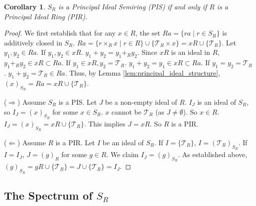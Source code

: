 \documentclass[11pt, a4paper]{article}
\theoremstyle{plain}
\newtheorem{corollary}[theorem]{Corollary}
\theoremstyle{definition}
\numberwithin{equation}{section}
\newcommand{\Tobj}{\mathcal{T}} %
\newcommand{\SR}{S_{R}}
\begin{document}
\begin{corollary}\label{cor:SR_is_PIS}
$\SR$ is a Principal Ideal Semiring (PIS) if and only if $R$ is a Principal Ideal Ring (PIR).
\end{corollary}
\begin{proof}
We first establish that for any $x \in R$, the set $Ra = \{ra \mid r \in \SR\}$ is additively closed in $\SR$.
$Ra = \{r\times_{R} x \mid r \in R\} \cup \{\Tobj_R\times x\} = xR \cup \{\Tobj_R\}$.
Let $y_1, y_2 \in Ra$.
If $y_1, y_2 \in xR$. $y_1+y_2 = y_1+_R y_2$. Since $xR$ is an ideal in $R$, $y_1+_R y_2 \in xR \subset Ra$.
If $y_1 \in xR, y_2=\Tobj_R$. $y_1+y_2=y_1 \in xR \subset Ra$.
If $y_1=y_2=\Tobj_R$. $y_1+y_2=\Tobj_R \in Ra$.
Thus, by Lemma \ref{lem:principal_ideal_structure}, $(x)_{\SR} = Ra = xR \cup \{\Tobj_R\}$.

($\Rightarrow$) Assume $\SR$ is a PIS. Let $J$ be a non-empty ideal of $R$. $I_J$ is an ideal of $\SR$, so $I_J=(x)_{\SR}$ for some $x \in \SR$. $x$ cannot be $\Tobj_R$ (as $J\neq\emptyset$). So $x \in R$.
$I_J = (x)_{\SR} = xR \cup \{\Tobj_R\}$.
This implies $J=xR$. So $R$ is a PIR.

($\Leftarrow$) Assume $R$ is a PIR. Let $I$ be an ideal of $\SR$.
If $I=\{\Tobj_R\}$, $I=(\Tobj_R)_{\SR}$.
If $I=I_J$, $J=(g)_{R}$ for some $g \in R$. We claim $I_J=(g)_{\SR}$.
As established above, $(g)_{\SR} = gR \cup \{\Tobj_R\} = J \cup \{\Tobj_R\} = I_J$.
\end{proof}

\subsection{The Spectrum of \texorpdfstring{$\SR$}{S\_R}}
\end{document}
